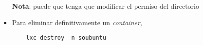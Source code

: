 \begin{questions}
\begin{itemize}
  \textbf{Nota}: puede que tenga que modificar el permiso del directorio
  
\item Para eliminar definitivamente un \textit{container},
\begin{verbatim}
   	lxc-destroy -n soubuntu
\end{verbatim}
  
\end{itemize}

\end{questions}